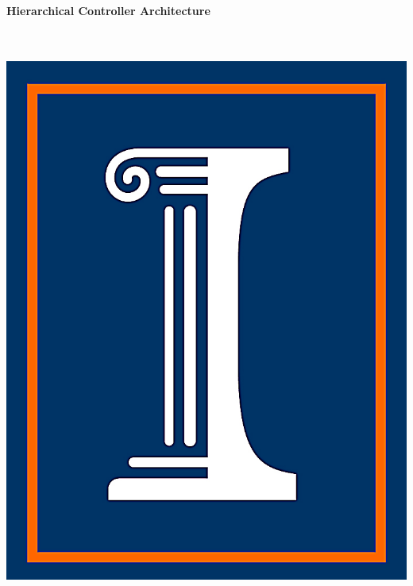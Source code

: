 \documentclass[portrait,a1]{a0poster}
\begin{document}




\begin{minipage}[b]{0.85\linewidth}
\Huge \color{NavyBlue} \textbf{Hierarchical Controller Architecture} \color{Black}\\[0.5cm] %
\Huge\color{NavyBlue}\\[1cm] %
\Large {}\\[0.5cm] %

\end{minipage}
%
\begin{minipage}[b]{0.15\linewidth}
\includegraphics[scale=0.8]{UIUC_logo.png}\\
\end{minipage}
\end{document}
